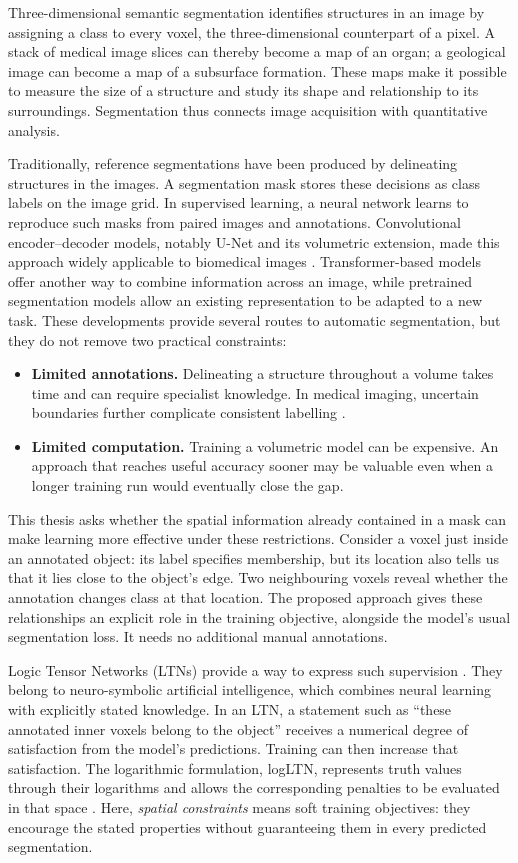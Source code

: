 \documentclass[12pt,a4paper]{article}
\begin{document}
Three-dimensional semantic segmentation identifies structures in an image
by assigning a class to every voxel, the three-dimensional counterpart
of a pixel. A stack of medical image slices can thereby become a map of
an organ; a geological image can become a map of a subsurface formation.
These maps make it possible to measure the size of a structure and study
its shape and relationship to its surroundings. Segmentation thus connects
image acquisition with quantitative analysis.

Traditionally, reference segmentations have been produced by delineating
structures in the images. A segmentation mask stores these decisions as
class labels on the image grid. In supervised learning, a neural network
learns to reproduce such masks from paired images and annotations.
Convolutional encoder--decoder models, notably U-Net and its volumetric
extension, made this approach widely applicable to biomedical images
\cite{ronneberger2015unet,cicek2016unet}. Transformer-based models offer
another way to combine information across an image, while pretrained
segmentation models allow an existing representation to be adapted to a
new task. These developments provide several routes to automatic
segmentation, but they do not remove two practical constraints:
\begin{itemize}
\item \textbf{Limited annotations.} Delineating a structure throughout a
volume takes time and can require specialist knowledge. In medical
imaging, uncertain boundaries further complicate consistent labelling
\cite{wang2021annotation}.
\item \textbf{Limited computation.} Training a volumetric model can be
expensive. An approach that reaches useful accuracy sooner may be
valuable even when a longer training run would eventually close the gap.
\end{itemize}

This thesis asks whether the spatial information already contained in a
mask can make learning more effective under these restrictions. Consider
a voxel just inside an annotated object: its label specifies membership,
but its location also tells us that it lies close to the object's edge.
Two neighbouring voxels reveal whether the annotation changes class at
that location. The proposed approach gives these relationships an explicit
role in the training objective, alongside the model's usual segmentation
loss. It needs no additional manual annotations.

Logic Tensor Networks (LTNs) provide a way to express such supervision
\cite{badreddine2022logic}. They belong to neuro-symbolic artificial
intelligence, which combines neural learning with explicitly stated
knowledge. In an LTN, a statement such as ``these annotated inner voxels
belong to the object'' receives a numerical degree of satisfaction from
the model's predictions. Training can then increase that satisfaction.
The logarithmic formulation, logLTN, represents truth values through
their logarithms and allows the corresponding penalties to be evaluated
in that space \cite{badreddine2023logltn}. Here, \emph{spatial constraints}
means soft training objectives: they encourage the stated properties
without guaranteeing them in every predicted segmentation.
\end{document}
